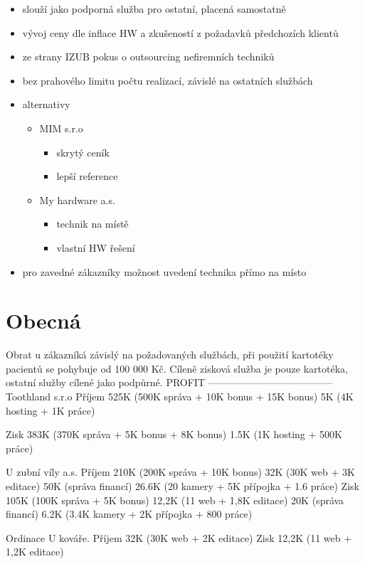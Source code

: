 \documentclass[11pt, a4paper, titlepage]{article}
\begin{document}
	\begin{itemize}
		\item slouží jako podporná služba pro ostatní, placená samostatně
		\item vývoj ceny dle inflace HW a zkušeností z požadavků předchozích klientů
		\item ze strany IZUB pokus o outsourcing nefiremních techniků
		\item bez prahového limitu počtu realizací, závislé na ostatních službách
		\item alternativy
		\begin{itemize}
			\item MIM s.r.o
			\begin{itemize}
				\item skrytý ceník
				\item lepší reference
			\end{itemize}
			\item My hardware a.s.
			\begin{itemize}
				\item technik na místě
				\item vlastní HW řešení
			\end{itemize}
		\end{itemize}
		\item pro zavedné zákazníky možnost uvedení technika přímo na místo
	\end{itemize}

	\section*{Obecná}
		Obrat u zákazníká závislý na požadovaných službách, při použití kartotéky pacientů se pohybuje od 100 000 Kč.
		Cíleně zisková služba je pouze kartotéka, ostatní služby cílené jako podpůrné.
		PROFIT
		--------------------------------------
		Toothland s.r.o 
			Příjem
				525K (500K správa + 10K bonus + 15K bonus)
				5K (4K hosting + 1K práce)

			Zisk
				383K (370K správa + 5K bonus + 8K bonus)
				1.5K (1K hosting + 500K práce)

		U zubní víly a.s.
			Příjem
				210K (200K správa + 10K bonus)
				32K (30K web + 3K editace)
				50K (správa financí)
				26.6K (20 kamery + 5K přípojka + 1.6 práce)
			Zisk
				105K (100K správa + 5K bonus)
				12,2K (11 web + 1,8K editace)
				20K (správa financí)
				6.2K (3.4K kamery + 2K přípojka + 800 práce)

		Ordinace U kováře. 
			Příjem
				32K (30K web + 2K editace)
			Zisk
				12,2K (11 web + 1,2K editace)
\end{document}
